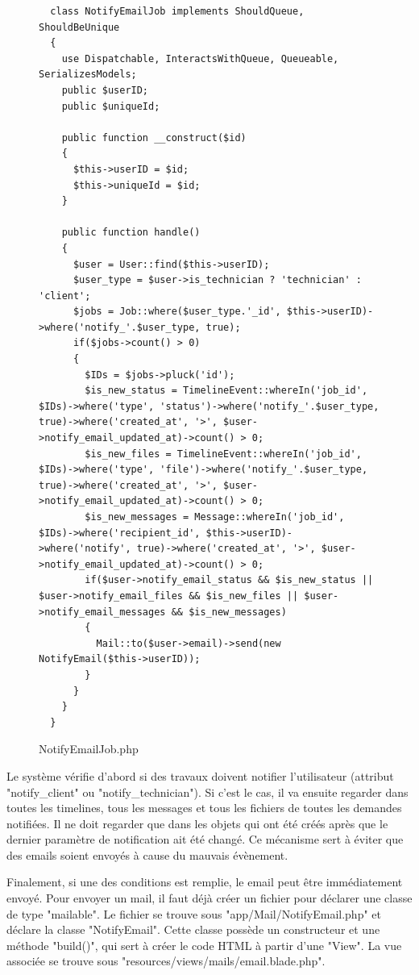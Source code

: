 \documentclass[
    iai, %
    eai, %
]{heig-tb}
\begin{document}
\begin{figure}[h]
  \begin{verbatim}
  class NotifyEmailJob implements ShouldQueue, ShouldBeUnique
  {
    use Dispatchable, InteractsWithQueue, Queueable, SerializesModels;
    public $userID;
    public $uniqueId;

    public function __construct($id)
    {
      $this->userID = $id;
      $this->uniqueId = $id;
    }

    public function handle()
    {
      $user = User::find($this->userID);
      $user_type = $user->is_technician ? 'technician' : 'client';
      $jobs = Job::where($user_type.'_id', $this->userID)->where('notify_'.$user_type, true);
      if($jobs->count() > 0)
      {
        $IDs = $jobs->pluck('id');
        $is_new_status = TimelineEvent::whereIn('job_id', $IDs)->where('type', 'status')->where('notify_'.$user_type, true)->where('created_at', '>', $user->notify_email_updated_at)->count() > 0;
        $is_new_files = TimelineEvent::whereIn('job_id', $IDs)->where('type', 'file')->where('notify_'.$user_type, true)->where('created_at', '>', $user->notify_email_updated_at)->count() > 0;
        $is_new_messages = Message::whereIn('job_id', $IDs)->where('recipient_id', $this->userID)->where('notify', true)->where('created_at', '>', $user->notify_email_updated_at)->count() > 0;
        if($user->notify_email_status && $is_new_status || $user->notify_email_files && $is_new_files || $user->notify_email_messages && $is_new_messages)
        {
          Mail::to($user->email)->send(new NotifyEmail($this->userID));
        }
      }
    }
  }
  \end{verbatim}
  \caption{NotifyEmailJob.php}
\end{figure}

Le système vérifie d'abord si des travaux doivent notifier l'utilisateur (attribut "notify\_client" ou "notify\_technician"). Si c'est le cas, il va ensuite regarder dans toutes les timelines, tous les messages et tous les fichiers de toutes les demandes notifiées. Il ne doit regarder que dans les objets qui ont été créés après que le dernier paramètre de notification ait été changé.
Ce mécanisme sert à éviter que des emails soient envoyés à cause du mauvais évènement.

\newpage
Finalement, si une des conditions est remplie, le email peut être immédiatement envoyé. Pour envoyer un mail, il faut déjà créer un fichier pour déclarer une classe de type "mailable". Le fichier se trouve sous "app/Mail/NotifyEmail.php" et déclare la classe "NotifyEmail". Cette classe possède un constructeur et une méthode "build()", qui sert à créer le code HTML à partir d'une "View". La vue associée se trouve sous "resources/views/mails/email.blade.php".
\end{document}
